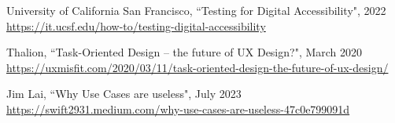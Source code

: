 \begin{thebibliography}{100}
 University of California San Francisco, ``Testing for Digital Accessibility", 2022
\href{https://it.ucsf.edu/how-to/testing-digital-accessibility}{https://it.ucsf.edu/how-to/testing-digital-accessibility}

 Thalion, ``Task-Oriented Design -- the future of UX Design?", March 2020
\href{https://uxmisfit.com/2020/03/11/task-oriented-design-the-future-of-ux-design/}{https://uxmisfit.com/2020/03/11/task-oriented-design-the-future-of-ux-design/}

 Jim Lai, ``Why Use Cases are useless", July 2023
\href{https://swift2931.medium.com/why-use-cases-are-useless-47c0e799091d}{https://swift2931.medium.com/why-use-cases-are-useless-47c0e799091d}


\end{thebibliography}
